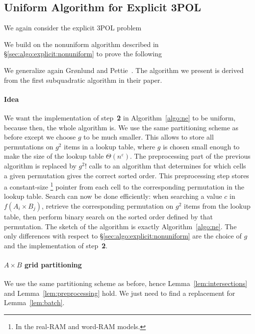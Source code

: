 \subsection{Uniform Algorithm for Explicit 3POL}%
\label{sec:algo:explicit:uniform}

We again consider the explicit 3POL problem
%
\ProblemPOLExplicit*

We build on the nonuniform algorithm described in
\S\ref{sec:algo:explicit:nonuniform} to prove the following
\restate{\TheoremPOLUniformExplicit*}

We generalize again Gr\o nlund and Pettie~\cite{GP18}. The
algorithm we present is derived from the first subquadratic algorithm in their
paper.

\paragraph{Idea}
We want the implementation of step~\textbf{2} in Algorithm~\ref{algo:ne} to be
uniform, because then, the whole algorithm is.
We use the same partitioning scheme as before except we choose $g$ to be much
smaller.
This allows to
store all permutations on $g^2$ items in a lookup table, where
$g$ is chosen small enough to make the size of the lookup table $\Theta(n^\varepsilon)$.
The preprocessing part of the previous algorithm is replaced by $ g^2! $ calls to
an algorithm that determines for which cells a given permutation gives the
correct sorted
order. This preprocessing step stores a constant-size%
\footnote{In the real-RAM and word-RAM models.}
pointer from each cell to
the corresponding permutation in the lookup table.
Search can now be done efficiently: when searching a value $c$ in $f(A_i
\times B_j)$, retrieve the corresponding permutation on $g^2$ items from the
lookup table,
then perform binary search on the sorted order defined by that permutation.
The sketch of the algorithm is exactly Algorithm~\ref{algo:ne}. The only
differences with respect to \S\ref{sec:algo:explicit:nonuniform} are the choice
of $g$ and the implementation of step~\textbf{2}.

\paragraph{$A \times B$ grid partitioning}
We use the same partitioning scheme as before, hence
Lemma~\ref{lem:intersections} and Lemma~\ref{lem:preprocessing} hold.
We just need to find a replacement for Lemma~\ref{lem:batch}.

